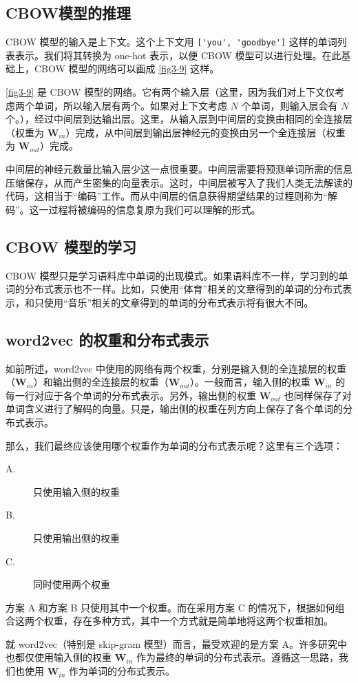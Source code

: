 \subsection{CBOW模型的推理}
CBOW 模型的输入是上下文。这个上下文用 \verb|['you', 'goodbye']| 这样的单词列表表示。我们将其转换为 one-hot 表示，以便 CBOW 模型可以进行处理。在此基础上，CBOW 模型的网络可以画成 \autoref{fig3-9} 这样。

\autoref{fig3-9} 是 CBOW 模型的网络。它有两个输入层（这里，因为我们对上下文仅考虑两个单词，所以输入层有两个。如果对上下文考虑 $N$ 个单词，则输入层会有 $N$ 个。），经过中间层到达输出层。这里，从输入层到中间层的变换由相同的全连接层（权重为 $\bm{W}_{in}$）完成，从中间层到输出层神经元的变换由另一个全连接层（权重为 $\bm{W}_{out}$）完成。


中间层的神经元数量比输入层少这一点很重要。中间层需要将预测单词所需的信息压缩保存，从而产生密集的向量表示。这时，中间层被写入了我们人类无法解读的代码，这相当于“编码”工作。而从中间层的信息获得期望结果的过程则称为“解码”。这一过程将被编码的信息复原为我们可以理解的形式。

\subsection{CBOW 模型的学习}
CBOW 模型只是学习语料库中单词的出现模式。如果语料库不一样，学习到的单词的分布式表示也不一样。比如，只使用“体育”相关的文章得到的单词的分布式表示，和只使用“音乐”相关的文章得到的单词的分布式表示将有很大不同。
\subsection{word2vec 的权重和分布式表示}
如前所述，word2vec 中使用的网络有两个权重，分别是输入侧的全连接层的权重（$\bm{W}_{in}$）和输出侧的全连接层的权重（$\bm{W}_{out}$）。一般而言，输入侧的权重 $\bm{W}_{in}$ 的每一行对应于各个单词的分布式表示。另外，输出侧的权重 $\bm{W}_{out}$ 也同样保存了对单词含义进行了解码的向量。只是，输出侧的权重在列方向上保存了各个单词的分布式表示。

那么，我们最终应该使用哪个权重作为单词的分布式表示呢？这里有三个选项：

\begin{description}
    \item[A.] 只使用输入侧的权重
    \item[B.] 只使用输出侧的权重
    \item[C.] 同时使用两个权重
\end{description}

方案 A 和方案 B 只使用其中一个权重。而在采用方案 C 的情况下，根据如何组合这两个权重，存在多种方式，其中一个方式就是简单地将这两个权重相加。

就 word2vec（特别是 skip-gram 模型）而言，最受欢迎的是方案 A。许多研究中也都仅使用输入侧的权重 $\bm{W}_{in}$ 作为最终的单词的分布式表示。遵循这一思路，我们也使用 $\bm{W}_{in}$ 作为单词的分布式表示。